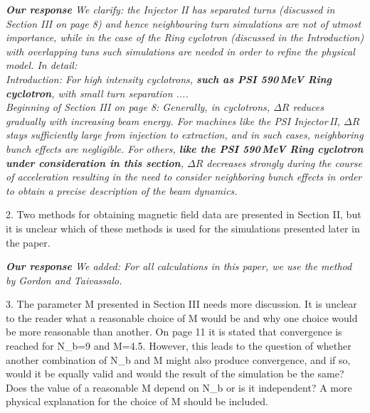 \documentclass{article}
\begin{document}
  \vspace{+2mm}
 {\it {\bf Our response}  We clarify:  the Injector II has separated turns (discussed in Section III on page 8) and
 hence neighbouring turn simulations are not of utmost importance, while in the case of 
 the Ring cyclotron (discussed in the Introduction)  with overlapping tuns such simulations are needed in order to 
 refine the physical model. In detail:\\
 
Introduction:  For high intensity cyclotrons, {\bf such as PSI 590\,MeV Ring cyclotron}, with small turn separation .... \\

Beginning of Section III on page 8: Generally, in cyclotrons, $\Delta R$ reduces gradually  with increasing beam energy.
For machines like the PSI Injector\,II, $\Delta R$ stays sufficiently large from injection to extraction, and in such cases,  neighboring bunch effects are negligible. 
For others, {\bf  like the PSI 590\,MeV Ring cyclotron under consideration in this section}, $\Delta R$ decreases strongly during the course of acceleration resulting in the need to consider neighboring bunch effects in order to obtain a precise description of the beam dynamics.
 \vspace{+2mm}
 
 
 
 2. Two methods for obtaining magnetic field data are presented in Section 
 II, but it is unclear which of these methods is used for the simulations 
 presented later in the paper. 
 
 \vspace{+2mm}
 {\it {\bf Our response} We added: For all calculations in this paper, we use the method by Gordon and Taivassalo.
 \vspace{+2mm}
 
 
 3. The parameter M presented in Section III needs more discussion. It is 
 unclear to the reader what a reasonable choice of M would be and why one 
 choice would be more reasonable than another. On page 11 it is stated that 
 convergence is reached for N{\_}b=9 and M=4.5. However, this leads to the 
 question of whether another combination of N{\_}b and M might also produce 
 convergence, and if so, would it be equally valid and would the result of 
 the simulation be the same? Does the value of a reasonable M depend on 
 N{\_}b or is it independent? A more physical explanation for the choice of M 
 should be included. 

}}
\end{document}
